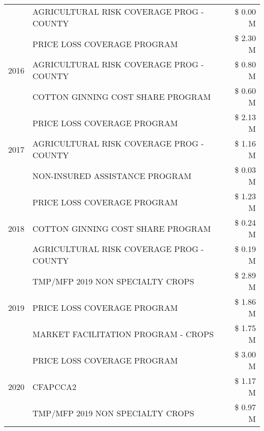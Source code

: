 \begin{tabular}{llr}
 & AGRICULTURAL RISK COVERAGE PROG - COUNTY & \$ 0.00 M \\
\cline{1-3}
\multirow[t]{3}{*}{2016} & PRICE LOSS COVERAGE PROGRAM & \$ 2.30 M \\
 & AGRICULTURAL RISK COVERAGE PROG - COUNTY & \$ 0.80 M \\
 & COTTON GINNING COST SHARE PROGRAM & \$ 0.60 M \\
\cline{1-3}
\multirow[t]{3}{*}{2017} & PRICE LOSS COVERAGE PROGRAM & \$ 2.13 M \\
 & AGRICULTURAL RISK COVERAGE PROG - COUNTY & \$ 1.16 M \\
 & NON-INSURED ASSISTANCE PROGRAM & \$ 0.03 M \\
\cline{1-3}
\multirow[t]{3}{*}{2018} & PRICE LOSS COVERAGE PROGRAM & \$ 1.23 M \\
 & COTTON GINNING COST SHARE PROGRAM & \$ 0.24 M \\
 & AGRICULTURAL RISK COVERAGE PROG - COUNTY & \$ 0.19 M \\
\cline{1-3}
\multirow[t]{3}{*}{2019} & TMP/MFP 2019 NON SPECIALTY CROPS & \$ 2.89 M \\
 & PRICE LOSS COVERAGE PROGRAM & \$ 1.86 M \\
 & MARKET FACILITATION PROGRAM - CROPS & \$ 1.75 M \\
\cline{1-3}
\multirow[t]{3}{*}{2020} & PRICE LOSS COVERAGE PROGRAM & \$ 3.00 M \\
 & CFAPCCA2 & \$ 1.17 M \\
 & TMP/MFP 2019 NON SPECIALTY CROPS & \$ 0.97 M \\
\cline{1-3}
\bottomrule
\end{tabular}
